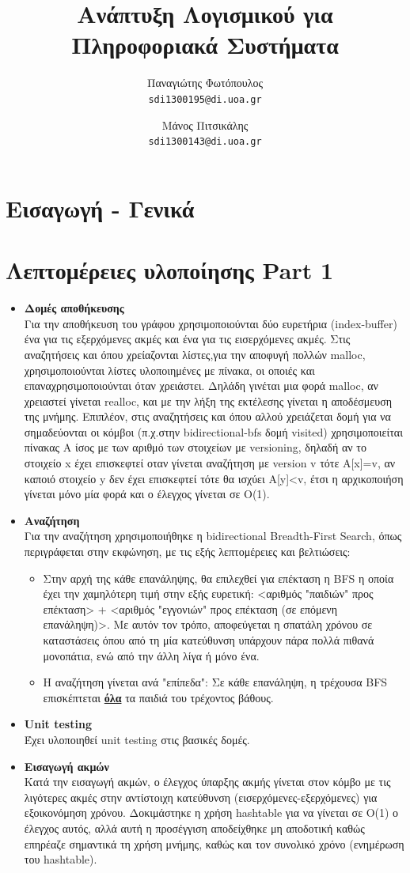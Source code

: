 \documentclass[12pt]{article}
\title{Ανάπτυξη Λογισμικού για Πληροφοριακά Συστήματα}
\author{Παναγιώτης Φωτόπουλος\\
  \texttt{sdi1300195@di.uoa.gr}
  \and Μάνος Πιτσικάλης\\
  \texttt{sdi1300143@di.uoa.gr}}
\date{}
\begin{document}
\maketitle


\section{Εισαγωγή - Γενικά}

\section{Λεπτομέρειες υλοποίησης Part 1}
\begin{itemize}
\item \textbf{Δομές αποθήκευσης}\\ Για την αποθήκευση του γράφου χρησιμοποιούνται δύο ευρετήρια (index-buffer) ένα για τις εξερχόμενες ακμές και ένα για τις εισερχόμενες ακμές. Στις αναζητήσεις και όπου χρείαζονται λίστες,για την αποφυγή πολλών malloc, χρησιμοποιούνται λίστες υλοποιημένες με πίνακα, οι οποιές και επαναχρησιμοποιούνται όταν χρειάστει. Δηλάδη γινέται μια φορά malloc, αν χρειαστεί γίνεται realloc, και με την λήξη της εκτέλεσης γίνεται η αποδέσμευση της μνήμης. Επιπλέον, στις αναζητήσεις και όπου αλλού χρειάζεται δομή για να σημαδεύονται οι κόμβοι (π.χ.στην bidirectional-bfs δομή visited) χρησιμοποιείται πίνακας A ίσος με των αριθμό των στοιχείων με versioning, δηλαδή αν το στοιχείο x έχει επισκεφτεί οταν γίνεται αναζήτηση με version v τότε A[x]=v, αν καποιό στοιχείο y δεν έχει επισκεφτεί τότε θα ισχύει A[y]<v, έτσι η αρχικοποιήση γίνεται μόνο μία φορά και ο έλεγχος γίνεται σε O(1).
\item \textbf{Αναζήτηση}\\ Για την αναζήτηση χρησιμοποιήθηκε η bidirectional Breadth-First Search, όπως περιγράφεται στην εκφώνηση, με τις εξής λεπτομέρειες και βελτιώσεις:
\begin{itemize}
\item Στην αρχή της κάθε επανάληψης, θα επιλεχθεί για επέκταση η BFS η οποία έχει την χαμηλότερη τιμή στην εξής ευρετική: <αριθμός "παιδιών" προς επέκταση> + <αριθμός "εγγονιών" προς επέκταση (σε επόμενη επανάληψη)>. Με αυτόν τον τρόπο, αποφεύγεται η σπατάλη χρόνου σε καταστάσεις όπου από τη μία κατεύθυνση υπάρχουν πάρα πολλά πιθανά μονοπάτια, ενώ από την άλλη λίγα ή μόνο ένα.
\item Η αναζήτηση γίνεται ανά "επίπεδα": Σε κάθε επανάληψη, η τρέχουσα BFS επισκέπτεται \textbf{\underline{όλα}} τα παιδιά του τρέχοντος βάθους.
\end{itemize}
\item \textbf{Unit testing}\\ Έχει υλοποιηθεί unit testing στις βασικές δομές.
\item \textbf{Εισαγωγή ακμών}\\ Κατά την εισαγωγή ακμών, ο έλεγχος ύπαρξης ακμής γίνεται στον κόμβο με τις λιγότερες ακμές στην αντίστοιχη κατεύθυνση (εισερχόμενες-εξερχόμενες) για εξοικονόμηση χρόνου. Δοκιμάστηκε η χρήση hashtable για να γίνεται σε O(1) ο έλεγχος αυτός, αλλά αυτή η προσέγγιση αποδείχθηκε μη αποδοτική καθώς επηρέαζε σημαντικά τη χρήση μνήμης, καθώς και τον συνολικό χρόνο (ενημέρωση του hashtable).
\end{itemize}
\end{document}
